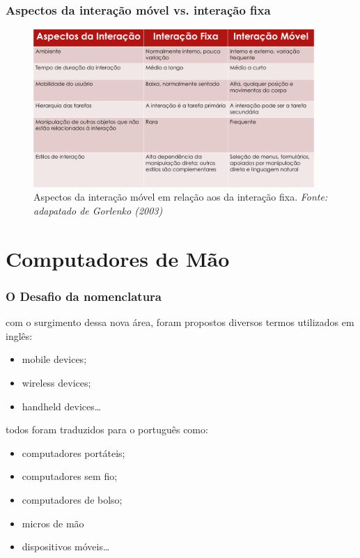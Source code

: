 \documentclass[presentation]{beamer}
\begin{document}
\begin{frame}[c]\frametitle{Aspectos da interação móvel vs. interação fixa}

    \begin{figure}[tb]
        \begin{center}
            \includegraphics[width=0.95\textwidth]{img/aspectos-interacao-movel-relacao-interacao-fixa.pdf}
        \end{center}
        \caption{Aspectos da interação móvel em relação aos da interação fixa. \textit{Fonte: adapatado de Gorlenko (2003)}}
        \label{fig:aspectos-interacao-movel-relacao-interacao-fixa}
    \end{figure}

\end{frame}

\section{Computadores de Mão} %
\label{sec:computadores_de_mao}

\begin{frame}[c]\frametitle{O Desafio da nomenclatura}
    
    com o surgimento dessa nova área, foram propostos diversos termos utilizados em inglês:

    \begin{itemize}
        \item mobile devices;
        \item wireless devices;
        \item handheld devices\ldots   
    \end{itemize}

    todos foram traduzidos para o português como:

    \begin{itemize}
        \item computadores portáteis;
        \item computadores sem fio;
        \item computadores de bolso;
        \item micros de mão
        \item dispositivos móveis\ldots
    \end{itemize}

\end{frame}
\end{document}
